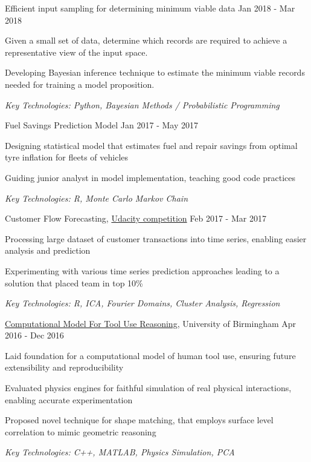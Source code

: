 \documentclass[11pt,article,oneside]{memoir}
\newenvironment{itemize*}{%
  \renewcommand\labelitemi{\textbullet}
  \footnotesize
  \begin{itemize}%
    \setlength{\itemsep}{0pt}}%
  {\end{itemize}
}
\begin{document}
\normalsize
\medskip
\ind Efficient input sampling for determining minimum viable data \hfill Jan 2018 - Mar 2018
\begin{itemize*}
  \item Given a small set of data, determine which records are required to achieve a representative view of the input space.
  \item Developing Bayesian inference technique to estimate the minimum viable records needed for training a model proposition.
\end{itemize*}
\ind \hspace{0.35in} \footnotesize \emph{Key Technologies: Python, Bayesian Methods / Probabilistic Programming}

\normalsize
\medskip
\ind Fuel Savings Prediction Model \hfill Jan 2017 - May 2017
\begin{itemize*}
  \item Designing statistical model that estimates fuel and repair savings from optimal tyre inflation for fleets of vehicles
  \item Guiding junior analyst in model implementation, teaching good code practices
\end{itemize*}
\ind \hspace{0.35in} \footnotesize \emph{Key Technologies: R, Monte Carlo Markov Chain}

\normalsize
\medskip
\ind Customer Flow Forecasting, \href{https://blog.udacity.com/2017/01/data-science-enthusiasts-win-10000.html}{Udacity competition} \hfill Feb 2017 - Mar 2017
\begin{itemize*}
  \item Processing large dataset of customer transactions into time series, enabling easier analysis and prediction  
  \item Experimenting with various time series prediction approaches leading to a solution that placed team in top 10\%
\end{itemize*}
\ind \hspace{0.35in} \footnotesize \emph{Key Technologies: R, ICA, Fourier Domains, Cluster Analysis, Regression}

\normalsize
\medskip
\ind \href{https://github.com/iceiony/4ConstraintsTheory/}{Computational Model For Tool Use Reasoning}, University of Birmingham \hfill Apr 2016 - Dec 2016
\begin{itemize*}
  \item Laid foundation for a computational model of human tool use, ensuring future extensibility and reproducibility 
  \item Evaluated physics engines for faithful simulation of real physical interactions, enabling accurate experimentation 
  \item Proposed novel technique for shape matching, that employs surface level correlation to mimic geometric reasoning
\end{itemize*}
\ind \hspace{0.35in} \footnotesize \emph{Key Technologies: C++, MATLAB, Physics Simulation, PCA}
\end{document}
